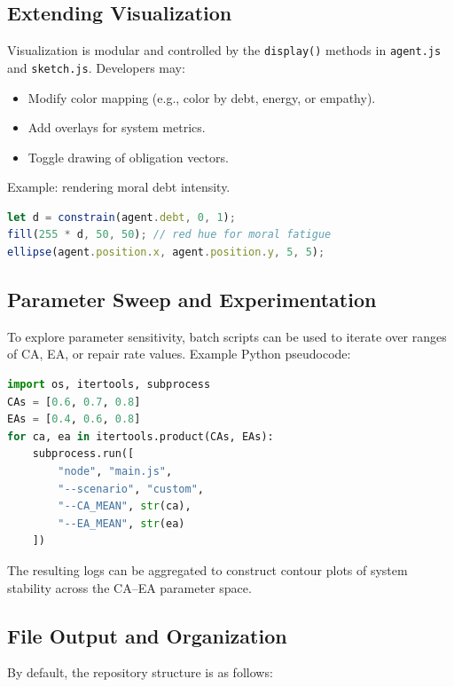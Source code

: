 \documentclass[11pt]{article}
\begin{document}
\subsection{Extending Visualization}

Visualization is modular and controlled by the \texttt{display()} methods in \texttt{agent.js} and \texttt{sketch.js}.  
Developers may:
\begin{itemize}
  \item Modify color mapping (e.g., color by debt, energy, or empathy).
  \item Add overlays for system metrics.
  \item Toggle drawing of obligation vectors.
\end{itemize}

Example: rendering moral debt intensity.

\begin{lstlisting}[language=JavaScript,caption={Color coding by contradiction debt}]
let d = constrain(agent.debt, 0, 1);
fill(255 * d, 50, 50); // red hue for moral fatigue
ellipse(agent.position.x, agent.position.y, 5, 5);
\end{lstlisting}

\subsection{Parameter Sweep and Experimentation}

To explore parameter sensitivity, batch scripts can be used to iterate over ranges of CA, EA, or repair rate values.  
Example Python pseudocode:

\begin{lstlisting}[language=Python,caption={Parameter sweep driver (Python)}]
import os, itertools, subprocess
CAs = [0.6, 0.7, 0.8]
EAs = [0.4, 0.6, 0.8]
for ca, ea in itertools.product(CAs, EAs):
    subprocess.run([
        "node", "main.js",
        "--scenario", "custom",
        "--CA_MEAN", str(ca),
        "--EA_MEAN", str(ea)
    ])
\end{lstlisting}

The resulting logs can be aggregated to construct contour plots of system stability across the CA–EA parameter space.

\subsection{File Output and Organization}

By default, the repository structure is as follows:
\end{document}
